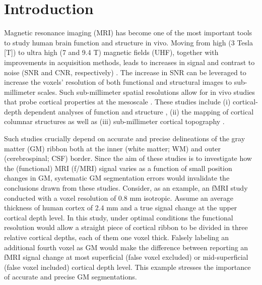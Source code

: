 \section{Introduction}
Magnetic resonance imaging (MRI) has become one of the most important tools to study human brain function and structure in vivo. Moving from high (3 Tesla [T]) to ultra high (7 and 9.4 T) magnetic fields (UHF), together with improvements in acquisition methods, leads to increases in signal and contrast to noise (SNR and CNR, respectively) \parencite{Vaughan2001, Duyn2011, Ugurbil2014}. The increase in SNR can be leveraged to increase the voxels' resolution of both functional and structural images to sub-millimeter scales. Such sub-millimeter spatial resolutions allow for in vivo studies that probe cortical properties at the mesoscale \parencite{DeMartino2016, Kemper2017, Dumoulin2017, Polimeni2017, Trampel2017}. These studies include (i) cortical-depth dependent analyses of function \parencite{Polimeni2010, Koopmans2011, DeMartino2013, Huber2015, Muckli2015, Kok2016} and structure \parencite{Kemper2017,Waehnert2014,Trampel2017}, (ii) the mapping of cortical columnar structures \parencite{Yacoub2008, Zimmermann2011, DeMartino2015, Goncalves2015, Nasr2016, Tootell2017} as well as (iii) sub-millimeter cortical topography \parencite{Harvey2013, Harvey2015, DeMartino2015, Fracasso2016}.

Such studies crucially depend on accurate and precise delineations of the gray matter (GM) ribbon both at the inner (white matter; WM) and outer (cerebrospinal; CSF) border. Since the aim of these studies is to investigate how the (functional) MRI (f/MRI) signal varies as a function of small position changes in GM, systematic GM segmentation errors would invalidate the conclusions drawn from these studies. Consider, as an example, an fMRI study conducted with a voxel resolution of 0.8 mm isotropic. Assume an average thickness of human cortex of 2.4 mm and a true signal change at the upper cortical depth level. In this study, under optimal conditions the functional resolution would allow a straight piece of cortical ribbon to be divided in three relative cortical depths, each of them one voxel thick. Falsely labeling an additional fourth voxel as GM would make the difference between reporting an fMRI signal change at most superficial (false voxel excluded) or mid-superficial (false voxel included) cortical depth level. This example stresses the importance of accurate and precise GM segmentations. 

